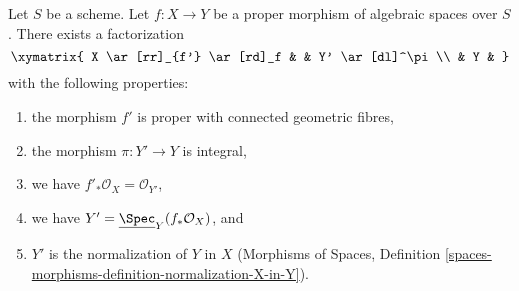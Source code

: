 \begin{theorem}
\label{theorem-stein-factorization-general}
Let $S$ be a scheme. Let $f : X \to Y$ be a proper morphism of algebraic
spaces over $S$. There exists a factorization
$$
\xymatrix{
X \ar[rr]_{f'} \ar[rd]_f & & Y' \ar[dl]^\pi \\
& Y &
}
$$
with the following properties:
\begin{enumerate}
\item the morphism $f'$ is proper with connected geometric fibres,
\item the morphism $\pi : Y' \to Y$ is integral,
\item we have $f'_*\mathcal{O}_X = \mathcal{O}_{Y'}$,
\item we have $Y' = \underline{\Spec}_Y(f_*\mathcal{O}_X)$, and
\item $Y'$ is the normalization of $Y$ in $X$ (Morphisms of Spaces, Definition
\ref{spaces-morphisms-definition-normalization-X-in-Y}).
\end{enumerate}
\end{theorem}

